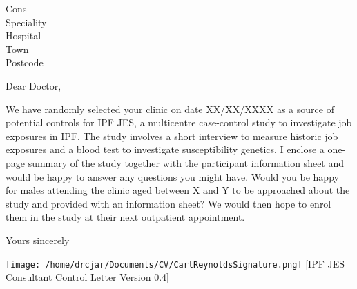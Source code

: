 \documentclass[imperial,letterpaper,pagesize,UScommercial9]{scrlttr2}
\begin{document}
\begin{letter}{Cons \\ Speciality \\ Hospital \\ Town \\ Postcode}


\opening{Dear Doctor,}

    We have randomly selected your clinic on date XX/XX/XXXX as a source of potential controls for IPF JES, a multicentre case-control study to investigate job exposures in IPF.
    The study involves a short interview to measure historic job exposures and a blood test to investigate susceptibility genetics. I enclose a one-page summary of the study together with the participant information sheet and would be happy to answer any questions you might have.
    Would you be happy for males attending the clinic aged between X and Y to be approached about the study and provided with an information sheet? We would then hope to enrol them in the study at their next outpatient appointment.


\closing{Yours sincerely}

    \texttt{[image: /home/drcjar/Documents/CV/CarlReynoldsSignature.png]}
     \vfill \hfill [IPF JES Consultant Control Letter Version 0.4]

\end{letter}
\end{document}
